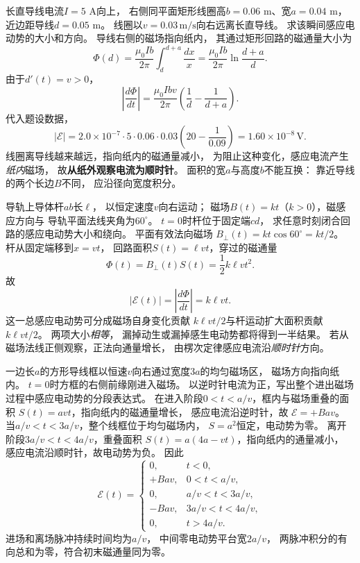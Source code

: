 \problemtext 长直导线电流$I=5$ A向上，
右侧同平面矩形线圈高$b=0.06$ m、宽$a=0.04$ m，
近边距导线$d=0.05$ m。
线圈以$v=0.03\,\mathrm{m/s}$向右远离长直导线。
求该瞬间感应电动势的大小和方向。
\workings
导线右侧的磁场指向纸内，
其通过矩形回路的磁通量大小为
\[
\Phi(d)=\frac{\mu_0Ib}{2\pi}
\int_d^{d+a}\frac{dx}{x}
=\frac{\mu_0Ib}{2\pi}\ln\frac{d+a}{d}.
\]
由于$d'(t)=v>0$，
\[
\left|\frac{d\Phi}{dt}\right|
=\frac{\mu_0Ibv}{2\pi}
\left(\frac1d-\frac1{d+a}\right).
\]
代入题设数据，
\[
\boxed{|\mathcal E|
=2.0\times10^{-7}\cdot5\cdot0.06\cdot0.03
\left(20-\frac1{0.09}\right)
=1.60\times10^{-8}\,\mathrm V}.
\]
线圈离导线越来越远，指向纸内的磁通量减小，
为阻止这种变化，感应电流产生\emph{纸内}磁场，
故\textbf{从纸外观察电流为顺时针}。
\crosscheck 面积的宽$a$与高度$b$不能互换：
靠近导线的两个长边$B$不同，
应沿径向宽度积分。

\problemtext 导轨上导体杆$ab$长$\ell$，
以恒定速度$v$向右运动；
磁场$B(t)=kt$（$k>0$），磁感应方向与
导轨平面法线夹角为$60^\circ$。
$t=0$时杆位于固定端$cd$，
求任意时刻闭合回路的感应电动势大小和绕向。
\workings
平面有效法向磁场
$B_\perp(t)=kt\cos60^\circ=kt/2$。
杆从固定端移到$x=vt$，
回路面积$S(t)=\ell vt$，穿过的磁通量
\[
\Phi(t)=B_\perp(t)S(t)
=\frac12k\ell v t^2.
\]
故
\[
\boxed{|\mathcal E(t)|
=\left|\frac{d\Phi}{dt}\right|
=k\ell vt}.
\]
这一总感应电动势可分成磁场自身变化贡献
$k\ell vt/2$与杆运动扩大面积贡献$k\ell vt/2$。
\crosscheck 两项大小\emph{相等}，
漏掉动生或漏掉感生电动势都将得到一半结果。
若从磁场法线正侧观察，正法向通量增长，
由楞次定律感应电流沿\emph{顺时针}方向。

\problemtext 一边长$a$的方形导线框以恒速$v$向右通过宽度$3a$的均匀磁场区，
磁场方向指向纸内。
$t=0$时方框的右侧前缘刚进入磁场。
以逆时针电流为正，写出整个进出磁场过程中感应电动势的分段表达式。
\workings
在进入阶段$0<t<a/v$，框内与磁场重叠的面积
$S(t)=avt$，指向纸内的磁通量增长，
感应电流沿逆时针，故
$\mathcal E=+Bav$。
当$a/v<t<3a/v$，整个线框位于均匀磁场内，
$S=a^2$恒定，电动势为零。
离开阶段$3a/v<t<4a/v$，重叠面积
$S(t)=a(4a-vt)$，指向纸内的通量减小，
感应电流沿顺时针，故电动势为负。
因此
\[
\boxed{\mathcal E(t)=
\begin{cases}
0,&t<0,\\
+Bav,&0<t<a/v,\\
0,&a/v<t<3a/v,\\
-Bav,&3a/v<t<4a/v,\\
0,&t>4a/v.
\end{cases}}
\]
\crosscheck 进场和离场脉冲持续时间均为$a/v$，
中间零电动势平台宽$2a/v$，
两脉冲积分的有向总和为零，符合初末磁通量同为零。
